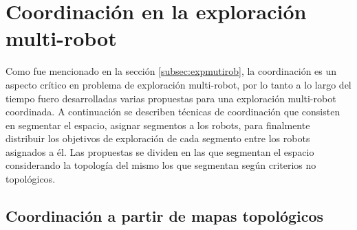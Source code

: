 




\section{Coordinación en la exploración multi-robot}
Como fue mencionado en la sección \ref{subsec:expmutirob}, la coordinación es
un aspecto crítico en problema de exploración multi-robot, por lo tanto a lo
largo del tiempo fuero desarrolladas varias propuestas para una exploración
multi-robot coordinada. A continuación se describen técnicas de coordinación que
consisten en segmentar el espacio, asignar segmentos a los robots, para
finalmente distribuir los objetivos de exploración de cada segmento entre los
robots asignados a él. Las propuestas se dividen en las que segmentan el
espacio considerando la topología del mismo los que segmentan según criterios
no topológicos.

\subsection{Coordinación a partir de mapas topológicos} \label{subsec:wurmCoord}


